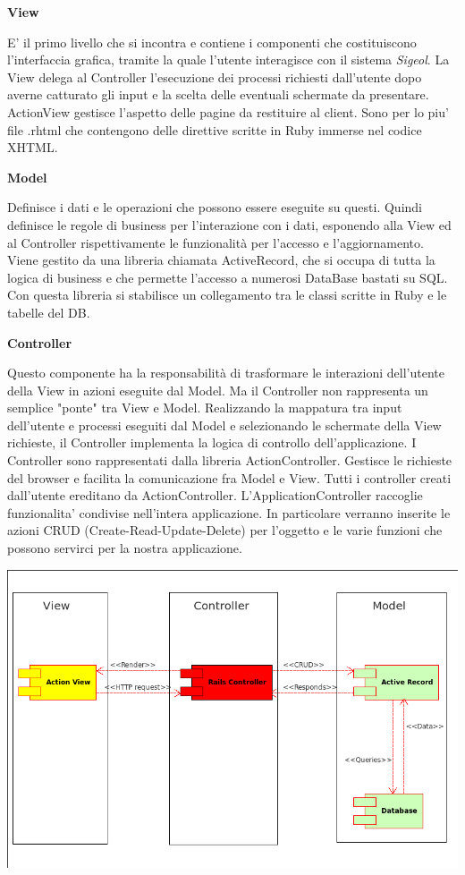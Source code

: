\documentclass[11pt,a4paper]{article}
\begin{document}
\begin{center}
 \textbf{View}
\end{center}
E' il primo livello che si incontra e contiene i componenti che costituiscono l'interfaccia grafica, tramite la quale l'utente interagisce con il sistema \textit{Sigeol}.
La View delega al Controller l'esecuzione dei processi richiesti dall'utente dopo averne catturato gli input e la
scelta delle eventuali schermate da presentare.
ActionView gestisce l'aspetto delle pagine da restituire al client. Sono per lo piu' file .rhtml che contengono delle direttive scritte in Ruby immerse nel codice XHTML.

\begin{center}
 \textbf{Model}
\end{center}
Definisce i dati e le operazioni che possono essere eseguite su questi. Quindi definisce le regole di business per l'interazione con i dati, esponendo alla View ed al Controller rispettivamente le funzionalità per l'accesso e l'aggiornamento.
Viene gestito da una libreria chiamata ActiveRecord, che si occupa di tutta la logica di business e che permette l'accesso a numerosi DataBase bastati su SQL. Con questa libreria si stabilisce un collegamento tra le classi scritte in Ruby e le tabelle del DB.

\begin{center}
 \textbf{Controller}
\end{center}
Questo componente ha la responsabilità di trasformare le interazioni dell'utente della View in azioni eseguite dal Model. Ma il Controller non rappresenta un semplice "ponte" tra View e Model. Realizzando la mappatura tra input dell'utente e processi eseguiti dal Model e selezionando le schermate della View richieste, il Controller implementa la logica di controllo dell'applicazione.
I Controller sono rappresentati dalla libreria ActionController.
Gestisce le richieste del browser e facilita la comunicazione fra Model e View. Tutti i controller creati dall'utente ereditano da ActionController. L'ApplicationController raccoglie funzionalita' condivise nell'intera applicazione.
In particolare verranno inserite le azioni CRUD (Create-Read-Update-Delete) per l'oggetto e le varie funzioni che possono servirci per la nostra applicazione.


\includegraphics[scale=0.50]{images/SIGEOL.png}
\end{document}
